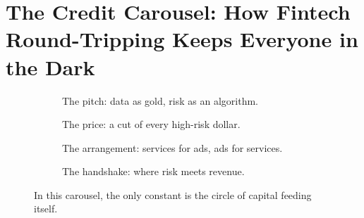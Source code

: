 \section{The Credit Carousel: How Fintech Round-Tripping Keeps Everyone in the Dark}

\vfill

\begin{figure}[H]
  \centering

  \begin{subfigure}[t]{0.45\textwidth}
    \centering
    \caption*{The pitch: data as gold, risk as an algorithm.}
  \end{subfigure}
  \hfill
  \begin{subfigure}[t]{0.45\textwidth}
    \centering
    \caption*{The price: a cut of every high-risk dollar.}
  \end{subfigure}

  \vspace{1em}

  \begin{subfigure}[t]{0.45\textwidth}
    \centering
    \caption*{The arrangement: services for ads, ads for services.}
  \end{subfigure}
  \hfill
  \begin{subfigure}[t]{0.45\textwidth}
    \centering
    \caption*{The handshake: where risk meets revenue.}
  \end{subfigure}

  \caption*{In this carousel, the only constant is the circle of capital feeding itself.}
\end{figure}

